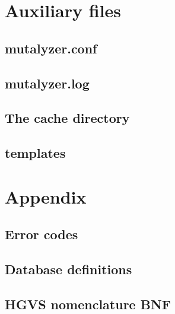 \documentclass{article}
\begin{document}
\newpage

\section{Auxiliary files}

\subsection{mutalyzer.conf}

\subsection{mutalyzer.log}

\subsection{The cache directory}

\subsection{templates}

\newpage

\appendix

\section{Appendix}

\subsection{Error codes} \label{subsec:error}


\subsection{Database definitions} \label{subsec:dbtables}


\subsection{HGVS nomenclature BNF} \label{subsec:bnf}


\newpage

{}

\end{document}
